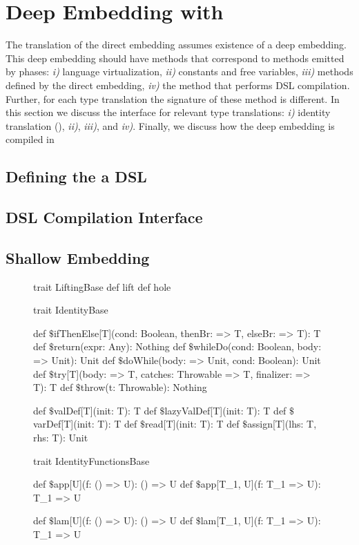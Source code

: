 \section{Deep Embedding with \yy}
\label{sec:deep-embedding-implementations}

The translation of the direct embedding assumes existence of a deep embedding. This deep embedding
should have methods that correspond to methods emitted by phases: \emph{i)} language virtualization,
\emph{ii)} constants and free variables, \emph{iii)} methods defined by the direct embedding, \emph{iv)} the
method that performs DSL compilation. Further, for each type translation the signature
of these method is different. In this section we discuss the interface for relevant
type translations: \emph{i)} identity translation (), \emph{ii)}, \emph{iii)}, and \emph{iv)}. Finally,
we discuss how the deep embedding is compiled in 


\subsection{Defining the a DSL}
\label{sct:connecting}
\subsection{DSL Compilation Interface}
\label{sct:compilation-interface}

\subsection{Shallow Embedding}
\label{sct:shallow-embedding}

\begin{figure}
\begin{listingtiny}
trait LiftingBase {
  def lift
  def hole
}

trait IdentityBase {
  def $\$$ifThenElse[T](cond: Boolean, thenBr: => T, elseBr: => T): T
  def $\$$return(expr: Any): Nothing
  def $\$$whileDo(cond: Boolean, body: => Unit): Unit
  def $\$$doWhile(body: => Unit, cond: Boolean): Unit
  def $\$$try[T](body: => T, catches: Throwable => T, finalizer: => T): T
  def $\$$throw(t: Throwable): Nothing

  def $\$$valDef[T](init: T): T
  def $\$$lazyValDef[T](init: T): T
  def $\$$varDef[T](init: T): T
  def $\$$read[T](init: T): T
  def $\$$assign[T](lhs: T, rhs: T): Unit
}

trait IdentityFunctionsBase {
  def $\$$app[U](f: () => U): () => U
  def $\$$app[T_1, U](f: T_1 => U): T_1 => U

  def $\$$lam[U](f: () => U): () => U
  def $\$$lam[T_1, U](f: T_1 => U): T_1 => U
}
\end{listingtiny}
\end{figure}

